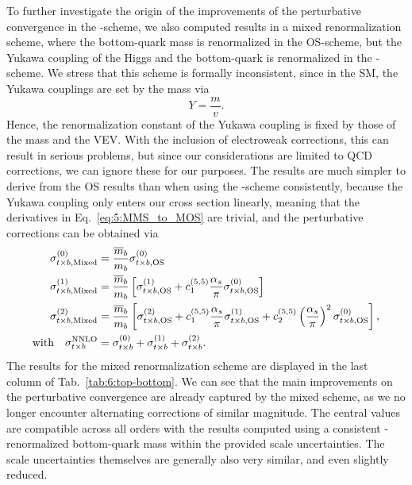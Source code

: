 To further investigate the origin of the improvements of the perturbative convergence in the \MS-scheme, we also computed results in a mixed renormalization scheme, where the bottom-quark mass is renormalized in the \acs{OS}-scheme, but the Yukawa coupling of the Higgs and the bottom-quark is renormalized in the \MS-scheme. We stress that this scheme is formally inconsistent, since in the \acs{SM}, the Yukawa couplings are set by the mass via
\begin{equation}
Y = \frac{m}{v}.
\end{equation}
Hence, the renormalization constant of the Yukawa coupling is fixed by those of the mass and the \acs{VEV}. With the inclusion of electroweak corrections, this can result in serious problems, but since our considerations are limited to \acs{QCD} corrections, we can ignore these for our purposes. The results are much simpler to derive from the \acs{OS} results than when using the \MS-scheme consistently, because the Yukawa coupling only enters our cross section linearly, meaning that the derivatives in Eq.~\eqref{eq:5:MMS_to_MOS} are trivial, and the perturbative corrections can be obtained via
\begin{equation}
\begin{split}
\sigma^{(0)}_{t\times b, \text{Mixed}} &= \frac{\overline{m}_b}{m_b} \sigma^{(0)}_{t\times b, \text{OS}} \\
\sigma^{(1)}_{t \times b, \text{Mixed}} &= \frac{\overline{m}_b}{m_b} \left[ \sigma^{(1)}_{t \times b, \text{OS}} + c_1^{(5,5)} \frac{\alpha_s}{\pi} \sigma^{(0)}_{t \times b, \text{OS}} \right] \\
\sigma^{(2)}_{t \times b, \text{Mixed}} &= \frac{\overline{m}_b}{m_b} \left[ \sigma^{(2)}_{t \times b, \text{OS}} + c_1^{(5,5)} \frac{\alpha_s}{\pi} \sigma^{(1)}_{t \times b, \text{OS}} + c_2^{(5,5)} \left( \frac{\alpha_s}{\pi} \right)^2 \sigma^{(0)}_{t \times b, \text{OS}} \right], \\
\text{with} \quad \sigma^{\text{NNLO}}_{t \times b} &= \sigma^{(0)}_{t \times b} + \sigma^{(1)}_{t \times b} + \sigma^{(2)}_{t \times b}.
\end{split}
\end{equation}
The results for the mixed renormalization scheme are displayed in the last column of Tab.~\ref{tab:6:top-bottom}. We can see that the main improvements on the perturbative convergence are already captured by the mixed scheme, as we no longer encounter alternating corrections of similar magnitude. The central values are compatible across all orders with the results computed using a consistent \MS-renormalized bottom-quark mass within the provided scale uncertainties. The scale uncertainties themselves are generally also very similar, and even slightly reduced.

